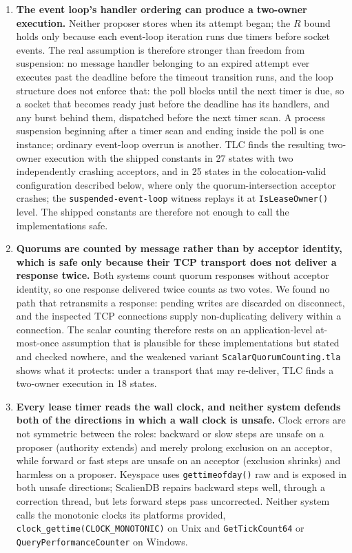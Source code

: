 \documentclass[final,5p,times,twocolumn,number]{elsarticle}
\newcommand{\code}[1]{\texttt{#1}}
\begin{document}
\begin{enumerate}
\item \textbf{The event loop's handler ordering can produce a two-owner execution.}  Neither proposer stores when its attempt began; the $R$ bound holds only because each event-loop iteration runs due timers before socket events.  The real assumption is therefore stronger than freedom from suspension: no message handler belonging to an expired attempt ever executes past the deadline before the timeout transition runs, and the loop structure does not enforce that: the poll blocks until the next timer is due, so a socket that becomes ready just before the deadline has its handlers, and any burst behind them, dispatched before the next timer scan.  A process suspension beginning after a timer scan and ending inside the poll is one instance; ordinary event-loop overrun is another.  TLC finds the resulting two-owner execution with the shipped constants in 27 states with two independently crashing acceptors, and in 25 states in the colocation-valid configuration described below, where only the quorum-intersection acceptor crashes; the \code{suspended-event-loop} witness replays it at \code{IsLeaseOwner()} level.  The shipped constants are therefore not enough to call the implementations safe.
\item \textbf{Quorums are counted by message rather than by acceptor identity, which is safe only because their TCP transport does not deliver a response twice.}  Both systems count quorum responses without acceptor identity, so one response delivered twice counts as two votes.  We found no path that retransmits a response: pending writes are discarded on disconnect, and the inspected TCP connections supply non-duplicating delivery within a connection.  The scalar counting therefore rests on an application-level at-most-once assumption that is plausible for these implementations but stated and checked nowhere, and the weakened variant \code{ScalarQuorumCounting.tla} shows what it protects: under a transport that may re-deliver, TLC finds a two-owner execution in 18 states.
\item \textbf{Every lease timer reads the wall clock, and neither system defends both of the directions in which a wall clock is unsafe.}  Clock errors are not symmetric between the roles: backward or slow steps are unsafe on a proposer (authority extends) and merely prolong exclusion on an acceptor, while forward or fast steps are unsafe on an acceptor (exclusion shrinks) and harmless on a proposer.  Keyspace uses \code{gettimeofday()} raw and is exposed in both unsafe directions; ScalienDB repairs backward steps well, through a correction thread, but lets forward steps pass uncorrected.  Neither system calls the monotonic clocks its platforms provided, \code{clock\_gettime(CLOCK\_MONOTONIC)} on Unix and \code{GetTickCount64} or \code{QueryPerformanceCounter} on Windows.

\end{enumerate}
\end{document}
